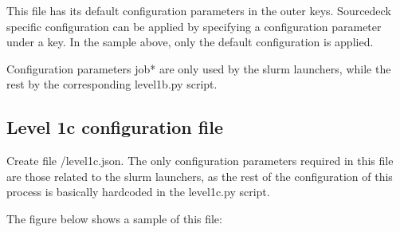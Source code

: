 \documentclass[letterpaper,10pt,english]{sphinxmanual}
\begin{document}
\begin{sphinxVerbatim}[commandchars=\\\{\}]
\end{sphinxVerbatim}

This file has its default configuration parameters in the outer keys.
Source\sphinxhyphen{}deck specific configuration can be applied by specifying a configuration
parameter under a  key. In the sample above, only the default
configuration is applied.

Configuration parameters job* are only used by the slurm launchers, while the
rest by the corresponding level1b.py script.


\subsection{Level 1c configuration file}
\label{\detokenize{index:level-1c-configuration-file}}\label{\detokenize{index:level1c-config-file}}
Create file /level1c.json. The only configuration parameters
required in this file are those related to the slurm launchers, as the rest of
the configuration of this process is basically hardcoded in the level1c.py
script.

The figure below shows a sample of this file:
\end{document}

